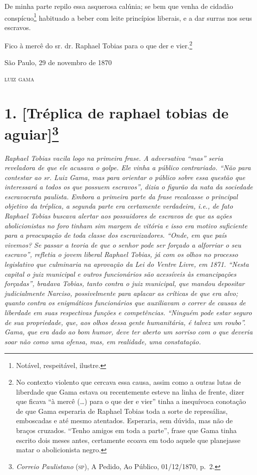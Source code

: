 De minha parte repilo essa asquerosa calúnia; se bem que venha de
cidadão conspícuo\footnote{ Notável, respeitável, ilustre.}
habituado a beber com leite princípios liberais, e a dar surras nos seus
escravos.

Fico à mercê do sr. dr. Raphael Tobias para o que der e vier.\footnote{
  No contexto violento que cercava essa causa, assim como a outras lutas
  de liberdade que Gama estava ou recentemente esteve na linha de
  frente, dizer que ficava ``à mercê (\ldots) para o que der e vier''
  tinha a inequívoca conotação de que Gama esperaria de Raphael Tobias
  toda a sorte de represálias, emboscadas e até mesmo atentados.
  Esperaria, sem dúvida, mas não de braços cruzados. ``Tenho amigos em
  toda a parte'', frase que Gama tinha escrito dois meses antes,
  certamente ecoava em todo aquele que planejasse matar o abolicionista
  negro.}

\begin{flushright}
São Paulo, 29 de novembro de 1870

\textsc{luiz gama}
\end{flushright}

\chapter{1. {[}Tréplica de raphael tobias de aguiar{]}\footnote{\emph{Correio Paulistano} (\textsc{sp}), A Pedido, Ao Público,
  01/12/1870, p.~2.}} %

\begin{didascalia}
\emph{Raphael Tobias vacila logo na primeira frase. A adversativa ``mas''
seria reveladora de que ele acusava o golpe. Ele vinha a público
contrariado. ``Não para contestar ao sr. Luiz Gama, mas para orientar o
público sobre essa questão que interessará a todos os que possuem
escravos'', dizia o figurão da nata da sociedade escravocrata paulista.
Embora a primeira parte da frase recalcasse o principal objetivo da
tréplica, a segunda parte era certamente verdadeira, i.e., de fato
Raphael Tobias buscava alertar aos possuidores de escravos de que as
ações abolicionistas no foro tinham sim margem de vitória e isso era
motivo suficiente para a preocupação de toda classe dos escravizadores.
``Onde, em que país vivemos? Se passar a teoria de que o senhor pode ser
forçado a alforriar o seu escravo'', refletia o jovem liberal Raphael
Tobias, já com os olhos no processo legislativo que culminaria na
aprovação da Lei do Ventre Livre, em 1871. ``Nesta capital o juiz
municipal e outros funcionários são acessíveis às emancipações
forçadas'', bradava Tobias, tanto contra o juiz municipal, que mandou
depositar judicialmente Narciso, possivelmente para aplacar as críticas
de que era alvo; quanto contra os enigmáticos funcionários que
auxiliavam o correr de causas de liberdade em suas respectivas funções e
competências. ``Ninguém pode estar seguro de sua propriedade, que, aos
olhos dessa gente humanitária, é talvez um roubo''. Gama, que era dado ao
bom humor, deve ter aberto um sorriso com o que deveria soar não como
uma ofensa, mas, em realidade, uma constatação.}
\end{didascalia}

